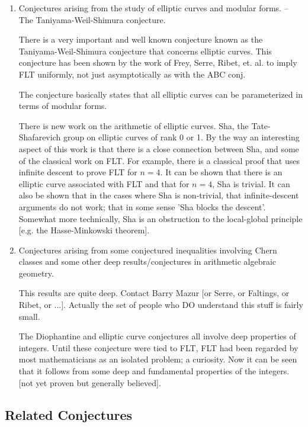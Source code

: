 {\begin{enumerate}
    \item Conjectures arising from the study of elliptic curves and
    modular forms. -- The Taniyama-Weil-Shimura conjecture.

    There is a very important and well known conjecture known as the
    Taniyama-Weil-Shimura conjecture that concerns elliptic curves.
    This conjecture has been shown by the work of Frey, Serre, Ribet,
    et. al. to imply FLT uniformly, not just asymptotically as with the
    ABC conj.

    The conjecture basically states that all elliptic curves can be
    parameterized in terms of modular forms.

    There is new work on the arithmetic of elliptic curves. Sha, the
    Tate-Shafarevich group on elliptic curves of rank 0 or 1. By the way
    an interesting aspect of this work is that there is a close
    connection between Sha, and some of the classical work on FLT. For
    example, there is a classical proof that uses infinite descent to
    prove FLT for $n = 4$. It can be shown that there is an elliptic
    curve associated with FLT and that for $n=4$, Sha is trivial. It can
    also be shown that in the cases where Sha is non-trivial, that
    infinite-descent arguments do not work; that in some sense 'Sha
    blocks the descent'. Somewhat more technically, Sha is an
    obstruction to the local-global principle [e.g. the Hasse-Minkowski
    theorem].

    \item Conjectures arising from some conjectured inequalities
    involving Chern classes and some other deep results/conjectures in
    arithmetic algebraic geometry.

    This results are quite deep. Contact Barry Mazur [or Serre, or
    Faltings, or Ribet, or ...]. Actually the set of people who DO
    understand this stuff is fairly small.

    The Diophantine and elliptic curve conjectures all involve deep
    properties of integers. Until these conjecture were tied to FLT, FLT
    had been regarded by most mathematicians as an isolated problem; a
    curiosity. Now it can be seen that it follows from some deep and
    fundamental properties of the integers. [not yet proven but
    generally believed].

  \end{enumerate}
}

\subsection{Related Conjectures}

